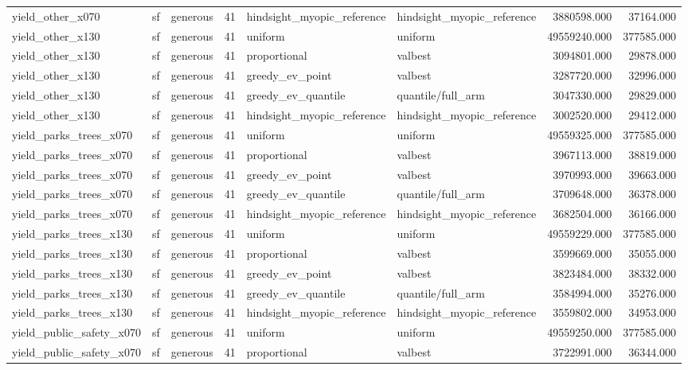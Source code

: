 \begin{tabular}{lllrllrr}
yield\_other\_x070 & sf & generous & 41 & hindsight\_myopic\_reference & hindsight\_myopic\_reference & 3880598.000 & 37164.000 \\
yield\_other\_x130 & sf & generous & 41 & uniform & uniform & 49559240.000 & 377585.000 \\
yield\_other\_x130 & sf & generous & 41 & proportional & valbest & 3094801.000 & 29878.000 \\
yield\_other\_x130 & sf & generous & 41 & greedy\_ev\_point & valbest & 3287720.000 & 32996.000 \\
yield\_other\_x130 & sf & generous & 41 & greedy\_ev\_quantile & quantile/full\_arm & 3047330.000 & 29829.000 \\
yield\_other\_x130 & sf & generous & 41 & hindsight\_myopic\_reference & hindsight\_myopic\_reference & 3002520.000 & 29412.000 \\
yield\_parks\_trees\_x070 & sf & generous & 41 & uniform & uniform & 49559325.000 & 377585.000 \\
yield\_parks\_trees\_x070 & sf & generous & 41 & proportional & valbest & 3967113.000 & 38819.000 \\
yield\_parks\_trees\_x070 & sf & generous & 41 & greedy\_ev\_point & valbest & 3970993.000 & 39663.000 \\
yield\_parks\_trees\_x070 & sf & generous & 41 & greedy\_ev\_quantile & quantile/full\_arm & 3709648.000 & 36378.000 \\
yield\_parks\_trees\_x070 & sf & generous & 41 & hindsight\_myopic\_reference & hindsight\_myopic\_reference & 3682504.000 & 36166.000 \\
yield\_parks\_trees\_x130 & sf & generous & 41 & uniform & uniform & 49559229.000 & 377585.000 \\
yield\_parks\_trees\_x130 & sf & generous & 41 & proportional & valbest & 3599669.000 & 35055.000 \\
yield\_parks\_trees\_x130 & sf & generous & 41 & greedy\_ev\_point & valbest & 3823484.000 & 38332.000 \\
yield\_parks\_trees\_x130 & sf & generous & 41 & greedy\_ev\_quantile & quantile/full\_arm & 3584994.000 & 35276.000 \\
yield\_parks\_trees\_x130 & sf & generous & 41 & hindsight\_myopic\_reference & hindsight\_myopic\_reference & 3559802.000 & 34953.000 \\
yield\_public\_safety\_x070 & sf & generous & 41 & uniform & uniform & 49559250.000 & 377585.000 \\
yield\_public\_safety\_x070 & sf & generous & 41 & proportional & valbest & 3722991.000 & 36344.000 \\

\end{tabular}
